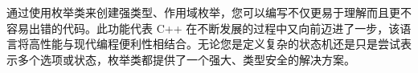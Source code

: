 通过使用枚举类来创建强类型、作用域枚举，您可以编写不仅更易于理解而且更不容易出错的代码。此功能代表 C++ 在不断发展的过程中又向前迈进了一步，该语言将高性能与现代编程便利性相结合。无论您是定义复杂的状态机还是只是尝试表示多个选项或状态，枚举类都提供了一个强大、类型安全的解决方案。














